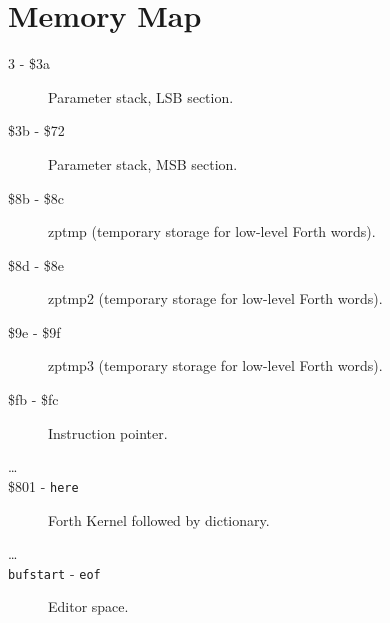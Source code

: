 \chapter{Memory Map}

\begin{description}
\item[3 - \$3a] Parameter stack, LSB section.
\item[\$3b - \$72] Parameter stack, MSB section.
\item[\$8b - \$8c] zptmp (temporary storage for low-level Forth words).
\item[\$8d - \$8e] zptmp2 (temporary storage for low-level Forth words).
\item[\$9e - \$9f] zptmp3 (temporary storage for low-level Forth words).
\item[\$fb - \$fc] Instruction pointer.
\item[\ldots]
\item[\$801 - \texttt{here}] Forth Kernel followed by dictionary.
\item[\ldots]
\item[\texttt{bufstart} - \texttt{eof}] Editor space.
\end{description}

